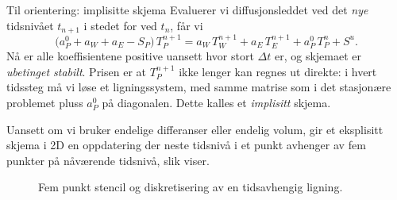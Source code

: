 \begin{rem}{Til orientering: implisitte skjema}
Evaluerer vi diffusjonsleddet ved det \emph{nye} tidsnivået $t_{n+1}$ i stedet for ved $t_n$, får vi
\[
\big(a_P^0 + a_W + a_E - S_P\big)\,T_P^{n+1} = a_W\,T_W^{n+1} + a_E\,T_E^{n+1} + a_P^0\,T_P^n + S^u .
\]
Nå er alle koeffisientene positive uansett hvor stort $\Delta t$ er, og skjemaet er \emph{ubetinget stabilt}. Prisen er at $T_P^{n+1}$ ikke lenger kan regnes ut direkte: i hvert tidssteg må vi løse et ligningssystem, med samme matrise som i det stasjonære problemet pluss $a_P^0$ på diagonalen. Dette kalles et \emph{implisitt} skjema.
\end{rem}

Uansett om vi bruker endelige differanser eller endelig volum, gir et eksplisitt skjema i 2D en oppdatering der neste tidsnivå i et punkt avhenger av fem punkter på nåværende tidsnivå, slik  viser.



\begin{figure} \centering
{}\caption{Fem punkt stencil og diskretisering av en tidsavhengig ligning.}\label{timdep_stencil}
\end{figure}

